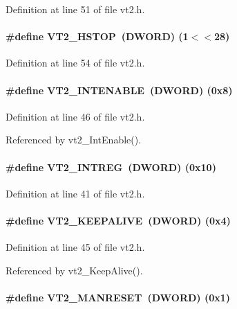 Definition at line 51 of file vt2.h.
\paragraph[{VT2\_\-HSTOP}]{\setlength{\rightskip}{0pt plus 5cm}\#define VT2\_\-HSTOP~({\bf DWORD}) (1$<$$<$28)}\hfill\label{vt2_8h_ace2dc6eada9a87209f0e0e00d2651e21}


Definition at line 54 of file vt2.h.
\paragraph[{VT2\_\-INTENABLE}]{\setlength{\rightskip}{0pt plus 5cm}\#define VT2\_\-INTENABLE~({\bf DWORD}) (0x8)}\hfill\label{vt2_8h_aea7c60d4c102673041e1cef43e877de5}


Definition at line 46 of file vt2.h.

Referenced by vt2\_\-IntEnable().
\paragraph[{VT2\_\-INTREG}]{\setlength{\rightskip}{0pt plus 5cm}\#define VT2\_\-INTREG~({\bf DWORD}) (0x10)}\hfill\label{vt2_8h_a83acdf8eaccd41787ef95d5ec44e68fc}


Definition at line 41 of file vt2.h.
\paragraph[{VT2\_\-KEEPALIVE}]{\setlength{\rightskip}{0pt plus 5cm}\#define VT2\_\-KEEPALIVE~({\bf DWORD}) (0x4)}\hfill\label{vt2_8h_af74c9c0766b9ade3faba4f0fc179fac9}


Definition at line 45 of file vt2.h.

Referenced by vt2\_\-KeepAlive().
\paragraph[{VT2\_\-MANRESET}]{\setlength{\rightskip}{0pt plus 5cm}\#define VT2\_\-MANRESET~({\bf DWORD}) (0x1)}\hfill\label{vt2_8h_ada65d244da9349e872d162e42bc75c03}


